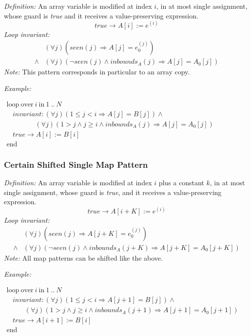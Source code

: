 \documentclass[a4paper,10pt]{article}
\newcommand{\idx}{\ensuremath{i}\xspace}
\newcommand{\at}[1]{{(#1)}}
\newcommand{\KWloop}{\ensuremath{\mathrm{loop}~}}
\newcommand{\KWend}{\ensuremath{\mathrm{end}~}}
\newcommand{\KWover}{\ensuremath{\mathrm{over}~}}
\newcommand{\KWin}{\ensuremath{~\mathrm{in}~}}
\newcommand{\impl}{\ensuremath{\Longrightarrow}}
\newcommand{\inbounds}[2]{\ensuremath{\mathit{inbounds}_{#1}(#2)}\xspace}
\newcommand{\seen}[1]{\ensuremath{\mathit{seen}(#1)}\xspace}
\newcommand{\loopinvariant}{\noindent\textit{Loop invariant:}\xspace}
\newcommand{\patterndef}{\noindent\textit{Definition:}\xspace}
\newcommand{\patternexample}{\noindent\textit{Example:}\xspace}
\newcommand{\patternnote}{\noindent\textit{Note:}\xspace}
\begin{document}
\patterndef An array variable is modified at index \idx, in at most single assignment, whose
guard is \textit{true} and it receives a value-preserving expression.
%
$$\mathit{true} \rightarrow A[\idx] := e^\at{\idx}$$
%
\loopinvariant
%
\begin{eqnarray*}
&(\forall j)(\seen{j} \impl A[j] = e_0^\at{j}) \\
\land& (\forall j)(\neg \seen{j} \land \inbounds{A}{j} \impl A[j] = A_0[j])
\end{eqnarray*}
%
\patternnote This pattern corresponds in particular to an array copy.

\bigskip
\patternexample

\medskip
$\begin{array}{l}
  \KWloop \KWover i \KWin 1~..~N \\
  ~~~~ \textit{invariant}: (\forall j)(1\leq j< i \impl A[j] = B[j]) \land\\
  ~~~~~~~~~~~~~~~~~~~ (\forall j)(1 > j \land j \geq i \land \inbounds{A}{j} \impl A[j] = A_0[j])\\
  ~~~~ true \rightarrow A[i] := B[i]\\
  \KWend
\end{array}$

\subsubsection*{Certain Shifted Single Map Pattern}

\patterndef An array variable is modified at index \idx plus a constant $k$, in at most single assignment, 
whose guard is \textit{true}, and it receives a value-preserving expression.
%
$$\mathit{true} \rightarrow A[\idx + K] := e^\at{\idx}$$
%
\loopinvariant
%
\begin{eqnarray*}
&(\forall j)(\seen{j} \impl A[j + K] = e_0^\at{j}) \\
\land& (\forall j)(\neg \seen{j} \land \inbounds{A}{j + K} \impl A[j + K] = A_0[j + K])
\end{eqnarray*}
%
\patternnote All map patterns can be shifted like the above.

\bigskip
\patternexample

\medskip
$\begin{array}{l}
  \KWloop \KWover i \KWin 1~..~N \\
  ~~~~ \textit{invariant}: (\forall j)(1 \leq j < i \impl A[j+1] = B[j]) \land\\
  ~~~~~~~~~~~~ (\forall j)(1 > j \land j \geq i \land \inbounds{A}{j+1} \impl A[j+1] = A_0[j+1])\\
  ~~~~ true \rightarrow A[i+1] := B[i]\\
  \KWend
\end{array}$
\end{document}
